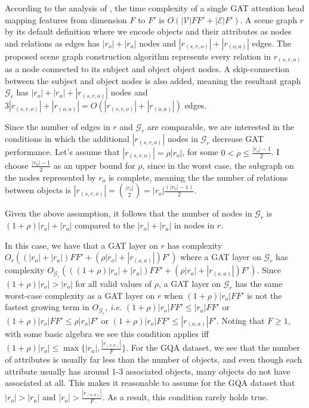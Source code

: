 According to the analysis of \citeauthor{velivckovic2017graph}, the time complexity of a single GAT attention head mapping features from dimension \(F\) to \(F'\) is \(O(|\mathcal{V}|FF' + |\mathcal{E}|F')\). A scene graph \(r\) by its default definition where we encode objects and their attributes as nodes and relations as edges has \(|r_o| + |r_a|\) nodes and \(|r_{(s, r, o)}| + |r_{(o, a)}|\) edges. The proposed scene graph construction algorithm represents every relation in \(r_{(s, r, o)}\) as a node connected to its subject and object object nodes. A skip-connection between the subject and object nodes is also added, meaning the resultant graph \(\mathcal{G}_r\) has \(|r_o| + |r_a| + |r_{(s, r, o)}|\) nodes and \(3|r_{(s, r, o)}| + |r_{(o, a)}| = O(|r_{(s, r, o)}| + |r_{(o, a)}|)\) edges.

Since the number of edges in \(r\) and \(\mathcal{G}_r\) are comparable, we are interested in the conditions in which the additional \(|r_{(s, r, o)}|\) nodes in \(\mathcal{G}_r\) decrease GAT performance. Let's assume that \(|r_{(s,r,o)}| = \rho |r_o|\), for some \(0 < \rho \leq \frac{|r_o| - 1}{2}\). I choose \(\frac{|r_o| - 1}{2}\) as an upper bound for \(\rho\), since in the worst case, the subgraph on the nodes represented by \(r_o\) is complete, meaning the the number of relations between objects is \(|r_{(s,r,o)}| = {|r_o| \choose 2} = |r_o|\frac{(|r_o| - 1)}{2}\).

Given the above assumption, it follows that the number of nodes in \(\mathcal{G}_r\) is \((1 + \rho)|r_o| + |r_a|\) compared to the \(|r_o| + |r_a|\) in nodes in \(r\).



In this case, we have that a GAT layer on \(r\) has complexity \(O_r((|r_o| + |r_a|)FF' + (\rho|r_o| + |r_{(o, a)}|)F')\) where a GAT layer on \(\mathcal{G}_r\) has complexity \(O_{\mathcal{G}_r}(((1 + \rho)|r_o| + |r_a|)FF' + (\rho|r_o| + |r_{(o, a)}|)F')\). Since \((1 + \rho)|r_o| > |r_o|\) for all valid values of \(\rho\), a GAT layer on \(\mathcal{G}_r\) has the same worst-case complexity as a GAT layer on \(r\) when \((1 + \rho)|r_o|FF'\) is not the fastest growing term in \(O_{\mathcal{G}_r}\), \textit{i.e.} \((1 + \rho)|r_o|FF' \leq |r_a|FF'\) or \((1 + \rho)|r_o|FF' \leq \rho|r_o|F'\) or \((1 + \rho)|r_o|FF' \leq |r_{(o, a)}|F'\). Noting that \(F \geq 1\), with some basic algebra we see this condition applies iff \((1 + \rho)|r_o| \leq \max\{|r_a|, \frac{|r_{(o,a)}|}{F}\}\). For the GQA dataset, we see that the number of attributes is usually far less than the number of objects, and even though each attribute usually has around 1-3 associated objects, many objects do not have associated at all. This makes it reasonable to assume for the GQA dataset that \(|r_o| > |r_a|\) and \(|r_o| > \frac{|r_{(o,a)}|}{F}\). As a result, this condition rarely holds true.

